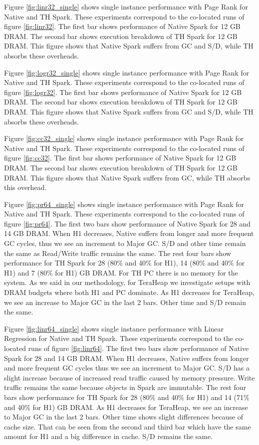 Figure \ref{fig:linr32_single} shows single instance performance with Page Rank for Native and TH Spark. These experiments correspond to the co-located runs of figure \ref{fig:linr32}. The first bar shows performance of Native Spark for 12 GB DRAM. The second bar shows execution breakdown of TH Spark for 12 GB DRAM. This figure shows that Native Spark suffers from GC and S/D, while TH absorbs these overheads.

Figure \ref{fig:logr32_single} shows single instance performance with Page Rank for Native and TH Spark. These experiments correspond to the co-located runs of figure \ref{fig:logr32}. The first bar shows performance of Native Spark for 12 GB DRAM. The second bar shows execution breakdown of TH Spark for 12 GB DRAM. This figure shows that Native Spark suffers from GC and S/D, while TH absorbs these overheads.

Figure \ref{fig:cc32_single} shows single instance performance with Page Rank for Native and TH Spark. These experiments correspond to the co-located runs of figure \ref{fig:cc32}. The first bar shows performance of Native Spark for 12 GB DRAM. The second bar shows execution breakdown of TH Spark for 12 GB DRAM. This figure shows that Native Spark suffers from GC, while TH absorbs this overhead.

Figure \ref{fig:pr64_single} shows single instance performance with Page Rank for Native and TH Spark. These experiments correspond to the co-located runs of figure \ref{fig:pr64}. The first two bars show performance of Native Spark for 28 and 14 GB DRAM. When H1 decreases, Native suffers from longer and more frequent GC cycles, thus we see an increment to Major GC. S/D and other time remain the same as Read/Write traffic remains the same. The rest four bars show performance for TH Spark for 28 (80\% and 40\% for H1), 14 (80\% and 40\% for H1) and 7 (80\% for H1) GB DRAM. For TH PC there is no memory for the system. As we said in our methodology, for TeraHeap we investigate setups with DRAM budgets where both H1 and PC dominate. As H1 decreases for TeraHeap, we see an increase to Major GC in the last 2 bars. Other time and S/D remain the same.

Figure \ref{fig:linr64_single} shows single instance performance with Linear Regression for Native and TH Spark. These experiments correspond to the co-located runs of figure \ref{fig:linr64}. The first two bars show performance of Native Spark for 28 and 14 GB DRAM. When H1 decreases, Native suffers from longer and more frequent GC cycles thus we see an increment to Major GC. S/D has a slight increase because of increased read traffic caused by memory pressure. Write traffic remains the same because objects in Spark are immutable. The rest four bars show performance for TH Spark for 28 (80\% and 40\% for H1) and 14 (71\% and 40\% for H1) GB DRAM. As H1 decreases for TeraHeap, we see an increase to Major GC in the last 2 bars. Other time shows slight differences because of cache size. That can be seen from the second and third bar which have the same amount for H1 and a big difference in cache. S/D remains the same.

